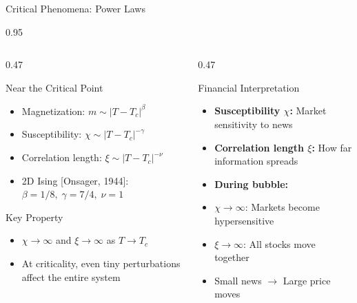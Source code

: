 \documentclass[9pt, aspectratio=169, t]{beamer}
\begin{document}
\begin{frame}{Critical Phenomena: Power Laws}
    \begin{cminipage}{0.95\textwidth}
    {\footnotesize
    \begin{columns}[T]
        \begin{column}{0.47\textwidth}
            \begin{block}{Near the Critical Point}
                \begin{itemize}\setlength{\itemsep}{0pt}
                    \item Magnetization: $m \sim |T - T_c|^{\beta}$
                    \item Susceptibility: $\chi \sim |T - T_c|^{-\gamma}$
                    \item Correlation length: $\xi \sim |T - T_c|^{-\nu}$
                    \item 2D Ising [Onsager, 1944]: $\beta = 1/8,\; \gamma = 7/4,\; \nu = 1$
                \end{itemize}
            \end{block}

            \begin{alertblock}{Key Property}
                \begin{itemize}\setlength{\itemsep}{0pt}
                    \item $\chi \to \infty$ and $\xi \to \infty$ as $T \to T_c$
                    \item At criticality, even tiny perturbations affect the entire system
                \end{itemize}
            \end{alertblock}
        \end{column}
        \begin{column}{0.47\textwidth}
            \begin{exampleblock}{Financial Interpretation}
                \begin{itemize}\setlength{\itemsep}{0pt}
                    \item \textbf{Susceptibility $\chi$:} Market sensitivity to news
                    \item \textbf{Correlation length $\xi$:} How far information spreads
                    \item \textbf{During bubble:}
                \end{itemize}
                \begin{itemize}\setlength{\itemsep}{0pt}
                    \item $\chi \to \infty$: Markets become hypersensitive
                    \item $\xi \to \infty$: All stocks move together
                    \item Small news $\to$ Large price moves
                \end{itemize}
            \end{exampleblock}


\end{column}
\end{columns}}
\end{cminipage}
\end{frame}
\end{document}
